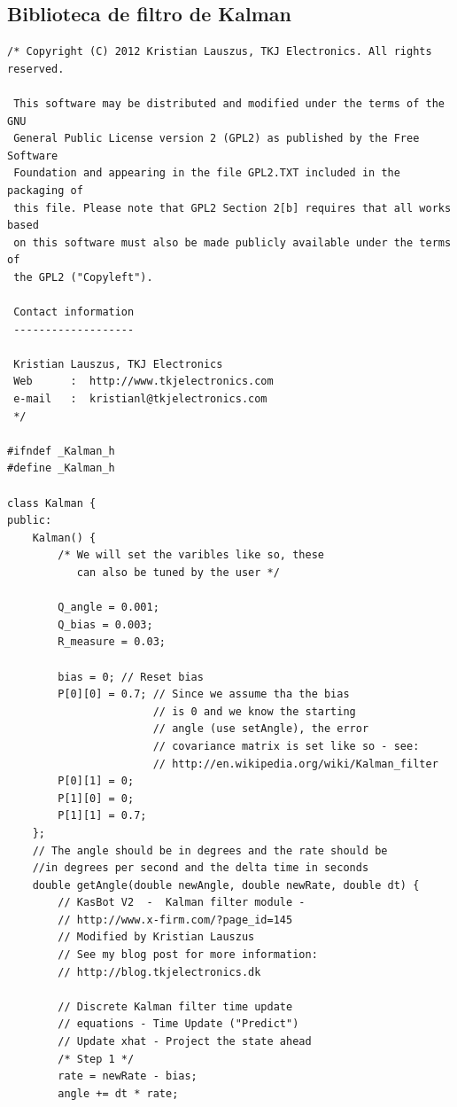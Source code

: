 \documentclass[a4paper,12pt]{article}
\begin{document}
\subsection{Biblioteca de filtro de Kalman}

{\singlespace\begin{lstlisting}
/* Copyright (C) 2012 Kristian Lauszus, TKJ Electronics. All rights reserved.
 
 This software may be distributed and modified under the terms of the GNU
 General Public License version 2 (GPL2) as published by the Free Software
 Foundation and appearing in the file GPL2.TXT included in the packaging of
 this file. Please note that GPL2 Section 2[b] requires that all works based
 on this software must also be made publicly available under the terms of
 the GPL2 ("Copyleft").
 
 Contact information
 -------------------
 
 Kristian Lauszus, TKJ Electronics
 Web      :  http://www.tkjelectronics.com
 e-mail   :  kristianl@tkjelectronics.com
 */

#ifndef _Kalman_h
#define _Kalman_h

class Kalman {
public:
    Kalman() {
        /* We will set the varibles like so, these 
           can also be tuned by the user */
        
        Q_angle = 0.001;
        Q_bias = 0.003;
        R_measure = 0.03;
        
        bias = 0; // Reset bias
        P[0][0] = 0.7; // Since we assume tha the bias 
                       // is 0 and we know the starting 
                       // angle (use setAngle), the error 
                       // covariance matrix is set like so - see:
                       // http://en.wikipedia.org/wiki/Kalman_filter
        P[0][1] = 0;
        P[1][0] = 0;
        P[1][1] = 0.7;
    };
    // The angle should be in degrees and the rate should be 
    //in degrees per second and the delta time in seconds
    double getAngle(double newAngle, double newRate, double dt) {
        // KasBot V2  -  Kalman filter module - 
        // http://www.x-firm.com/?page_id=145
        // Modified by Kristian Lauszus
        // See my blog post for more information: 
        // http://blog.tkjelectronics.dk
                        
        // Discrete Kalman filter time update 
        // equations - Time Update ("Predict")
        // Update xhat - Project the state ahead
        /* Step 1 */
        rate = newRate - bias;
        angle += dt * rate;
        

\end{lstlisting}}
\end{document}
